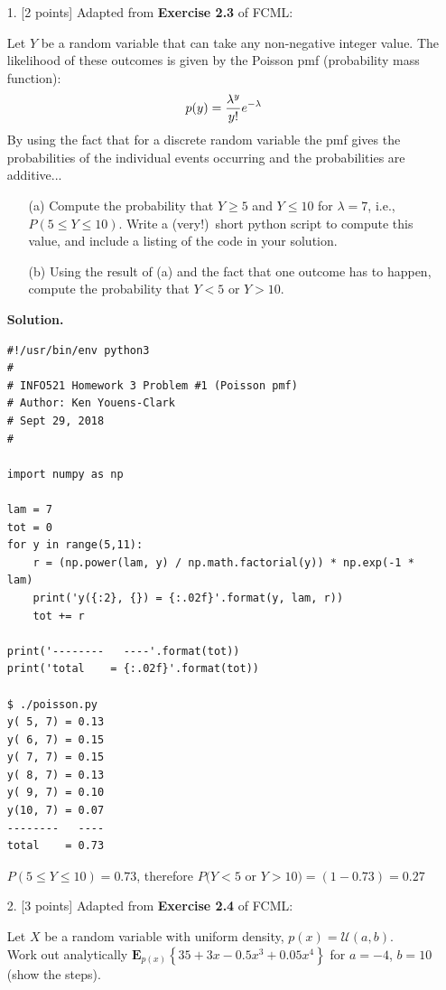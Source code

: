 \documentclass[10pt]{article}
\begin{document}
\begin{itemize}

\item[1.] [2 points]
Adapted from {\bf Exercise 2.3} of FCML:

Let $Y$ be a random variable that can take any non-negative integer value.  The likelihood of these outcomes is given by the Poisson pmf (probability mass function):
\begin{eqnarray}
p(y) = {\lambda^y\over y!} e^{-\lambda}
\end{eqnarray}
By using the fact that for a discrete random variable the pmf gives the probabilities of the individual events occurring and the probabilities are additive...
\begin{enumerate}
\item[(a)] Compute the probability that $Y \geq 5$ and $Y \leq 10$ for $\lambda = 7$, i.e., $P(5 \leq Y \leq 10)$.  Write a (very!)~short python script to compute this value, and include a listing of the code in your solution.
\item[(b)] Using the result of (a) and the fact that one outcome has to happen, compute the probability that $Y < 5$ or $Y > 10$.
\end{enumerate}

{\bf Solution.} %

\begin{verbatim}
#!/usr/bin/env python3
#
# INFO521 Homework 3 Problem #1 (Poisson pmf)
# Author: Ken Youens-Clark
# Sept 29, 2018
#

import numpy as np

lam = 7
tot = 0
for y in range(5,11):
    r = (np.power(lam, y) / np.math.factorial(y)) * np.exp(-1 * lam)
    print('y({:2}, {}) = {:.02f}'.format(y, lam, r))
    tot += r

print('--------   ----'.format(tot))
print('total    = {:.02f}'.format(tot))

$ ./poisson.py
y( 5, 7) = 0.13
y( 6, 7) = 0.15
y( 7, 7) = 0.15
y( 8, 7) = 0.13
y( 9, 7) = 0.10
y(10, 7) = 0.07
--------   ----
total    = 0.73
\end{verbatim}

$P(5 \leq Y \leq 10) = 0.73$, therefore $P(Y < 5$ or $Y > 10) = (1 - 0.73) = 0.27$

\item[2.] [3 points]
Adapted from {\bf Exercise 2.4} of FCML:

Let $X$ be a random variable with uniform density, $p(x) = \mathcal{U}(a,b)$.  \\
Work out analytically $\mathbf{E}_{p(x)} \left\{ 35 + 3x - 0.5x^3 + 0.05x^4 \right\}$ for $a=-4$, $b=10$ (show the steps).  


\end{itemize}
\end{document}
